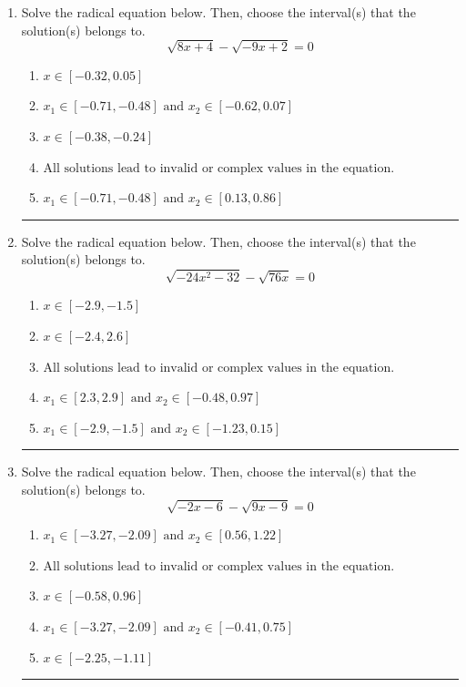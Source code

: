 \documentclass[14pt]{extbook}
\newcommand{\litem}[1]{\item#1\hspace*{-1cm}\rule{\textwidth}{0.4pt}}
\begin{document}
\begin{enumerate}
{\begin{enumerate}[label=\Alph*.]
\end{enumerate} }
\litem{
Solve the radical equation below. Then, choose the interval(s) that the solution(s) belongs to.\[ \sqrt{8 x + 4} - \sqrt{-9 x + 2} = 0 \]\begin{enumerate}[label=\Alph*.]
\item \( x \in [-0.32,0.05] \)
\item \( x_1 \in [-0.71, -0.48] \text{ and } x_2 \in [-0.62,0.07] \)
\item \( x \in [-0.38,-0.24] \)
\item \( \text{All solutions lead to invalid or complex values in the equation.} \)
\item \( x_1 \in [-0.71, -0.48] \text{ and } x_2 \in [0.13,0.86] \)

\end{enumerate} }
\litem{
Solve the radical equation below. Then, choose the interval(s) that the solution(s) belongs to.\[ \sqrt{-24 x^2 - 32} - \sqrt{76 x} = 0 \]\begin{enumerate}[label=\Alph*.]
\item \( x \in [-2.9,-1.5] \)
\item \( x \in [-2.4,2.6] \)
\item \( \text{All solutions lead to invalid or complex values in the equation.} \)
\item \( x_1 \in [2.3, 2.9] \text{ and } x_2 \in [-0.48,0.97] \)
\item \( x_1 \in [-2.9, -1.5] \text{ and } x_2 \in [-1.23,0.15] \)

\end{enumerate} }
\litem{
Solve the radical equation below. Then, choose the interval(s) that the solution(s) belongs to.\[ \sqrt{-2 x - 6} - \sqrt{9 x - 9} = 0 \]\begin{enumerate}[label=\Alph*.]
\item \( x_1 \in [-3.27, -2.09] \text{ and } x_2 \in [0.56,1.22] \)
\item \( \text{All solutions lead to invalid or complex values in the equation.} \)
\item \( x \in [-0.58,0.96] \)
\item \( x_1 \in [-3.27, -2.09] \text{ and } x_2 \in [-0.41,0.75] \)
\item \( x \in [-2.25,-1.11] \)


\end{enumerate}}
\end{enumerate}
\end{document}
